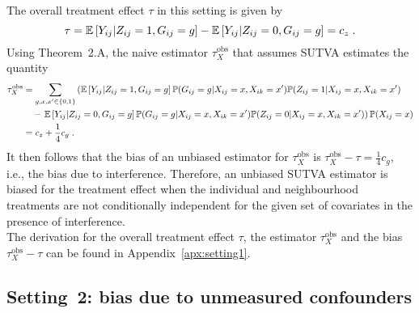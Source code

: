 \documentclass[10pt]{article}
\begin{document}
The overall treatment effect $\tau$ in this setting is given by
\[
\tau = \mathbb{E}\left[Y_{ij}|Z_{ij}=1,G_{ij}=g\right] - \mathbb{E}\left[Y_{ij}|Z_{ij}=0,G_{ij}=g\right] = c_z \;.
\]
Using Theorem~2.A, the naive estimator $\tau_{X}^\text{obs}$ that assumes SUTVA estimates the quantity
\begin{align*}
\tau_{X}^\text{obs} &= \sum_{g,x,x'\in\{0,1\}}\left(\mathbb{E}\left[Y_{ij}|Z_{ij}=1,G_{ij}=g\right]\mathbb{P}(G_{ij}=g|X_{ij}=x,X_{ik}=x')\mathbb{P}(Z_{ij}=1|X_{ij}=x,X_{ik}=x')\right. \\
&\quad - \left.\mathbb{E}\left[Y_{ij}|Z_{ij}=0,G_{ij}=g\right]\mathbb{P}(G_{ij}=g|X_{ij}=x,X_{ik}=x')\mathbb{P}(Z_{ij}=0|X_{ij}=x,X_{ik}=x')\right)\mathbb{P}(X_{ij}=x) \\
&= c_z + \frac{1}{4}c_g \;.
\end{align*}
It then follows that the bias of an unbiased estimator for $\tau_{X}^\text{obs}$ is $\tau_{X}^\text{obs} - \tau = \frac{1}{4}c_g$, i.e., the bias due to interference. Therefore, an unbiased SUTVA estimator is biased for the treatment effect when the individual and neighbourhood treatments are not conditionally independent for the given set of covariates in the presence of interference.
\\

The derivation for the overall treatment effect $\tau$, the estimator $\tau_{X}^\text{obs}$ and the bias $\tau_{X}^\text{obs}-\tau$ can be found in Appendix~\ref{apx:setting1}.

\subsection{Setting~2: bias due to unmeasured confounders}
\end{document}
